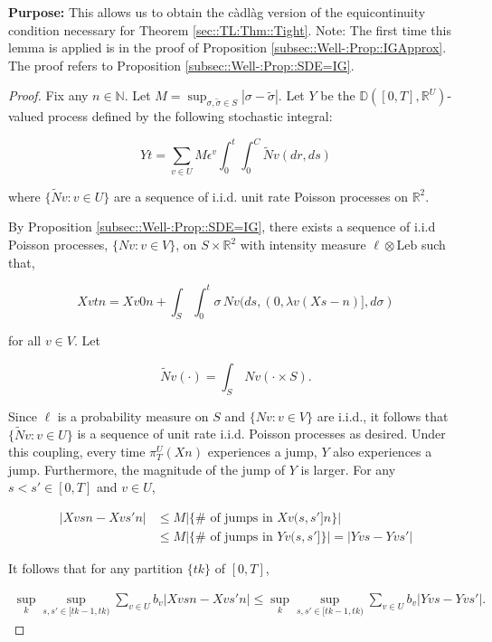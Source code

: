 \documentclass[12pt]{article}
\newcommand{\mb}{\mathbb}
\newcommand{\te}{\text}
\newcommand{\ep}{\epsilon}
\newcommand{\purpose}{\textbf{Purpose: }}
\newcommand{\ind}{\hspace{24pt}}
\newcommand{\cad}{\mb{D}}							%
\renewcommand{\v}{v}							%
\renewcommand{\U}{U}							%
\renewcommand{\S}{S}							%
\newcommand{\s}{\sigma}							%
\renewcommand{\b}{b}							%
\newcommand{\ev}{\ep}							%
\newcommand{\T}{T}								%
\renewcommand{\t}{t}							%
\newcommand{\proj}{\pi}							%
\renewcommand{\tt}{s}							%
\newcommand{\ttt}{s'}							%
\newcommand{\X}{X}								%
\newcommand{\vind}[1]{^{#1}}					%
\newcommand{\vsi}[1]{^{#1}}						%
\newcommand{\cind}[1]{_{#1}}					%
\newcommand{\ts}[1]{_{#1}}						%
\newcommand{\const}{C}							%
\renewcommand{\ss}{\tilde{\s}}					%
\newcommand{\poiss}{N}							%
\newcommand{\leb}{\te{Leb}}						%
\newcommand{\Sm}{\ell}							%
\newcommand{\rate}{\lambda}						%
\renewcommand{\r}{r}							%
\newcommand{\cconst}{M}							%
\newcommand{\alt}[1]{\widetilde{#1}}			%
\newcommand{\XX}{Y}								%
\renewcommand{\it}{k}							%
\begin{document}
\purpose This allows us to obtain the c\`adl\`ag version of the equicontinuity condition necessary for Theorem \ref{sec::TL:Thm::Tight}. Note: The first time this lemma is applied is in the proof of Proposition \ref{subsec::Well-:Prop::IGApprox}. The proof refers to Proposition \ref{subsec::Well-:Prop::SDE=IG}.

\begin{proof}
Fix any \(n \in \mb{N}\). Let \(\cconst = \sup_{\s,\ss \in \S} |\s - \ss|\). Let \(\XX{}{}\) be the \(\cad([0,\T],\mb{R}^\U)\)-valued process defined by the following stochastic integral:

\[\XX{}{\t} = \sum_{\v \in \U}\cconst\ev\vind{\v}\int_0^\t\int_0^{\const{}}\alt{\poiss}{\v}(d\r, d\tt)\]

where \(\{\alt{\poiss}{\v}:\v \in \U\}\) are a sequence of i.i.d. unit rate Poisson processes on \(\mb{R}^2\). 

\ind By Proposition \ref{subsec::Well-:Prop::SDE=IG}, there exists a sequence of i.i.d Poisson processes, \(\{\poiss{\v}:\v\in V\}\), on \(\S\times\mb{R}^2\) with intensity measure \(\Sm\otimes \leb\) such that,

\[\X{\v}{\t}{n} = \X{\v}{0}{n} + \int_\S\int_0^\t \s\,\poiss{\v}(d\tt,(0,\rate{\v}(\X{}{\tt-}{n})],d\s)\]

for all \(\v\in V\). Let

\[\alt{\poiss}{\v}(\cdot) = \int_\S\,\poiss{\v}(\cdot\times \S).\]

Since \(\Sm\) is a probability measure on \(\S\) and \(\{\poiss{\v}:\v\in V\}\) are i.i.d., it follows that \(\{\alt{\poiss}{\v}:\v\in \U\}\) is a sequence of unit rate i.i.d. Poisson processes as desired. Under this coupling, every time \(\proj\vsi{\U}\ts{\T}(\X{}{}{n})\) experiences a jump, \(\XX{}{}\) also experiences a jump. Furthermore, the magnitude of the jump of \(\XX{}{}\) is larger. For any \(\tt<\ttt\in [0,\T]\) and \(\v\in \U\),

\begin{align*}
|\X{\v}{\tt}{n} - \X{\v}{\ttt}{n}|&\leq \cconst\left|\{\#\te{ of jumps in }\X{\v}{(\tt,\ttt]}{n}\}\right| \\
&\leq \cconst\left|\{\#\te{ of jumps in }\XX{\v}{(\tt,\ttt]}\}\right| = \left|\XX{\v}{\tt} - \XX{\v}{\ttt}\right|
\end{align*}

It follows that for any partition \(\{\t{\it}\}\) of \([0,\T]\),

\begin{align*}
\sup_\it\sup_{\tt,\ttt \in [\t{\it-1},\t{\it})} \sum_{\v\in \U} \b\cind{\v}|\X{\v}{\tt}{n} - \X{\v}{\ttt}{n}|\leq \sup_\it\sup_{\tt,\ttt \in [\t{\it-1},\t{\it})} \sum_{\v\in \U} \b\cind{\v}|\XX{\v}{\tt} - \XX{\v}{\ttt}|.
\end{align*}


\end{proof}
\end{document}
